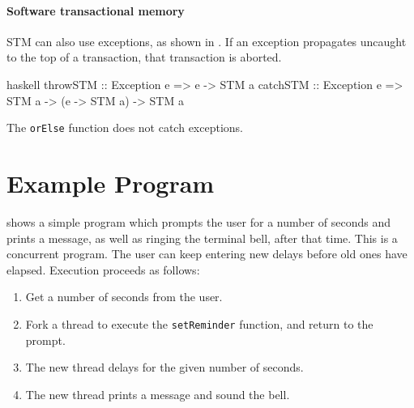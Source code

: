 \paragraph{Software transactional memory}
STM can also use exceptions, as shown in .
If an exception propagates uncaught to the top of a transaction, that
transaction is aborted.

\begin{listing}
\centering
\begin{cminted}{haskell}
throwSTM :: Exception e => e -> STM a
catchSTM :: Exception e => STM a -> (e -> STM a) -> STM a
\end{cminted}
\caption{STM exceptions in Haskell.}\label{lst:excstm_haskell}
\end{listing}

The \verb|orElse| function does not catch exceptions.

\section{Example Program}
\label{sec:concurrent_haskell-example}

\begin{listing}
\centering
{}
\caption{A simple alarm program.}\label{lst:ch_ex1}
\end{listing}

 shows a simple program which prompts the user for a
number of seconds and prints a message, as well as ringing the
terminal bell, after that time.  This is a concurrent program.  The
user can keep entering new delays before old ones have elapsed.
Execution proceeds as follows:

\begin{enumerate}
\item Get a number of seconds from the user.
\item Fork a thread to execute the \verb|setReminder| function, and
  return to the prompt.
\item The new thread delays for the given number of seconds.
\item The new thread prints a message and sound the bell.
\end{enumerate}

